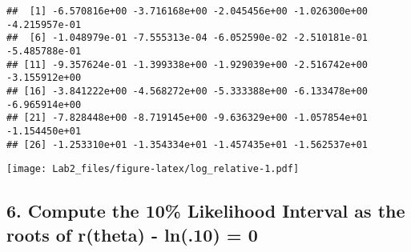 \documentclass[
]{article}
\newenvironment{Shaded}{\begin{snugshade}}{\end{snugshade}}
\newcommand{\AttributeTok}[1]{\textcolor[rgb]{0.13,0.29,0.53}{#1}}
\newcommand{\CommentTok}[1]{\textcolor[rgb]{0.56,0.35,0.01}{\textit{#1}}}
\newcommand{\ControlFlowTok}[1]{\textcolor[rgb]{0.13,0.29,0.53}{\textbf{#1}}}
\newcommand{\DecValTok}[1]{\textcolor[rgb]{0.00,0.00,0.81}{#1}}
\newcommand{\FunctionTok}[1]{\textcolor[rgb]{0.13,0.29,0.53}{\textbf{#1}}}
\newcommand{\NormalTok}[1]{#1}
\newcommand{\OtherTok}[1]{\textcolor[rgb]{0.56,0.35,0.01}{#1}}
\newcommand{\SpecialCharTok}[1]{\textcolor[rgb]{0.81,0.36,0.00}{\textbf{#1}}}
\newcommand{\StringTok}[1]{\textcolor[rgb]{0.31,0.60,0.02}{#1}}
\begin{document}
\begin{verbatim}
##  [1] -6.570816e+00 -3.716168e+00 -2.045456e+00 -1.026300e+00 -4.215957e-01
##  [6] -1.048979e-01 -7.555313e-04 -6.052590e-02 -2.510181e-01 -5.485788e-01
## [11] -9.357624e-01 -1.399338e+00 -1.929039e+00 -2.516742e+00 -3.155912e+00
## [16] -3.841222e+00 -4.568272e+00 -5.333388e+00 -6.133478e+00 -6.965914e+00
## [21] -7.828448e+00 -8.719145e+00 -9.636329e+00 -1.057854e+01 -1.154450e+01
## [26] -1.253310e+01 -1.354334e+01 -1.457435e+01 -1.562537e+01
\end{verbatim}

\begin{Shaded}
\end{Shaded}

\texttt{[image: Lab2\_files/figure-latex/log\_relative-1.pdf]}

\hypertarget{compute-the-10-likelihood-interval-as-the-roots-of-rtheta---ln.10-0}{%
\subsection{6. Compute the 10\% Likelihood Interval as the roots of
r(theta) - ln(.10) =
0}\label{compute-the-10-likelihood-interval-as-the-roots-of-rtheta---ln.10-0}}
\end{document}
